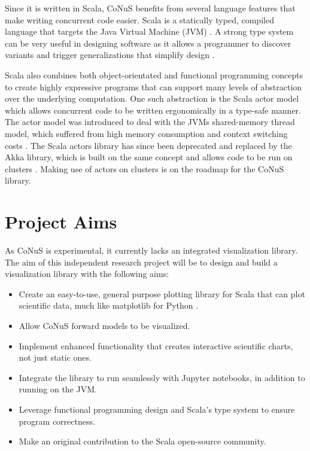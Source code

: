 \documentclass[12pt]{article}
\begin{document}
Since it is written in Scala, CoNuS benefits from several language features that make writing concurrent code easier. Scala is a statically typed, compiled language that targets the Java Virtual Machine (JVM) \autocite{scala}. A strong type system can be very useful in designing software as it allows a programmer to discover variants and trigger generalizations that simplify design \autocite{LAMMEL20081}. 

Scala also combines both object-orientated and functional programming concepts to create highly expressive programs that can support many levels of abstraction over the underlying computation. One such abstraction is the Scala actor model which allows concurrent code to be written ergonomically in a type-safe manner. The actor model was introduced to deal with the JVMs shared-memory thread model, which suffered from high memory consumption and context switching costs \autocite{haller_odersky_2009}. The Scala actors library has since been deprecated and replaced by the Akka library, which is built on the same concept and allows code to be run on clusters \autocite{akka}. Making use of actors on clusters is on the roadmap for the CoNuS library.

\section{Project Aims}
As CoNuS is experimental, it currently lacks an integrated visualization library. The aim of this independent research project will be to design and build a visualization library with the following aims:

\begin{itemize}
\item Create an easy-to-use, general purpose plotting library for Scala that can plot scientific data, much like matplotlib for Python \autocite{matplotlib}.
\item Allow CoNuS forward models to be visualized.
\item Implement enhanced functionality that creates interactive scientific charts, not just static ones. 
\item Integrate the library to run seamlessly with Jupyter notebooks, in addition to running on the JVM.
\item Leverage functional programming design and Scala's type system to ensure program correctness.
\item Make an original contribution to the Scala open-source community.
\end{itemize}
\end{document}
